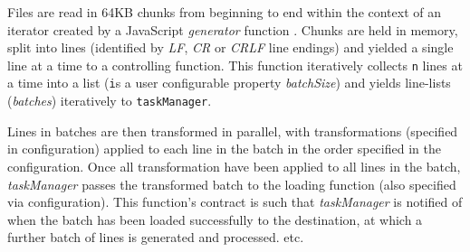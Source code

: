 Files are read in 64KB chunks from beginning to end within the context of an iterator created by a JavaScript \textit{generator} function \cite{mozillaGenerators}. Chunks are held in memory, split into lines (identified by \textit{LF}, \textit{CR} or \textit{CRLF} line endings) and yielded a single line at a time to a controlling function. This function iteratively collects \texttt{n} lines at a time into a list (\texttt is a user configurable property \textit{batchSize}) and yields line-lists (\textit{batches}) iteratively to \texttt{taskManager}.

Lines in batches are then transformed in parallel, with transformations (specified in configuration) applied to each line in the batch in the order specified in the configuration. Once all transformation have been applied to all lines in the batch, \textit{taskManager} passes the transformed batch to the loading function (also specified via configuration). This function's contract is such that \textit{taskManager} is notified of when the batch has been loaded successfully to the destination, at which a further batch of lines is generated and processed. etc.

